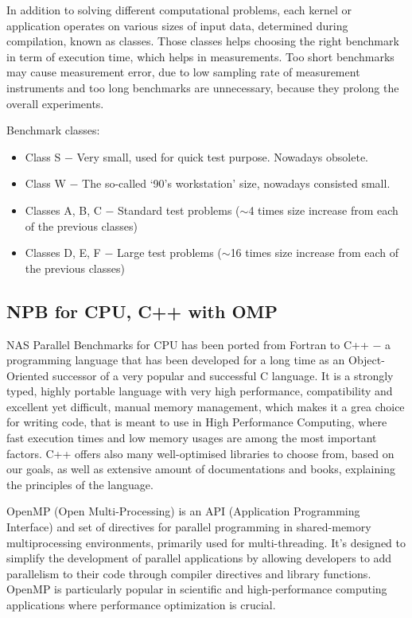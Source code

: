 In addition to solving different computational problems, each kernel or
application operates on various sizes of input data, determined during
compilation, known as classes. Those classes helps choosing the right benchmark
in term of execution time, which helps in measurements. Too short benchmarks may
cause measurement error, due to low sampling rate of measurement instruments and
too long benchmarks are unnecessary, because they prolong the overall experiments.

Benchmark classes:
\begin{itemize}
    \item Class S $-$ Very small, used for quick test purpose. Nowadays obsolete.
    \item Class W $-$ The so-called `90's workstation' size, nowadays consisted small.
    \item Classes A, B, C $-$ Standard test problems ($\sim$4 times size increase from
    each of the previous classes)
    \item Classes D, E, F $-$ Large test problems ($\sim$16 times size increase from
    each of the previous classes)
\end{itemize}


\subsection{NPB for CPU, C++ with OMP}

NAS Parallel Benchmarks for CPU has been ported from Fortran to C++ $-$ a programming
language that has been developed for a long time as an Object-Oriented successor of
a very popular and successful C language. It is a strongly typed, highly portable
language with very high performance, compatibility and excellent yet difficult,
manual memory management, which makes it a grea choice for writing code, that
is meant to use in High Performance Computing, where fast execution times and low
memory usages are among the most important factors. C++ offers also many 
well-optimised libraries to choose from, based on our goals, as well as extensive
amount of documentations and books, explaining the principles of the language.

OpenMP (Open Multi-Processing) is an API (Application Programming Interface)
and set of directives for parallel programming in shared-memory multiprocessing
environments, primarily used for multi-threading. It's designed to simplify
the development of parallel applications by allowing developers to add parallelism
to their code through compiler directives and library functions. OpenMP is
particularly popular in scientific and high-performance computing applications
where performance optimization is crucial.

